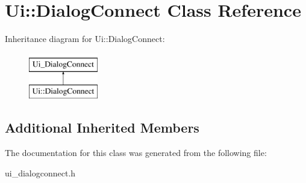 \hypertarget{classUi_1_1DialogConnect}{\section{Ui\-:\-:Dialog\-Connect Class Reference}
\label{classUi_1_1DialogConnect}
}
Inheritance diagram for Ui\-:\-:Dialog\-Connect\-:\begin{figure}[H]
\begin{center}
\leavevmode
\includegraphics[height=2.000000cm]{classUi_1_1DialogConnect}
\end{center}
\end{figure}
\subsection*{Additional Inherited Members}


The documentation for this class was generated from the following file\-:\begin{DoxyCompactItemize}
\item 
ui\-\_\-dialogconnect.\-h\end{DoxyCompactItemize}

